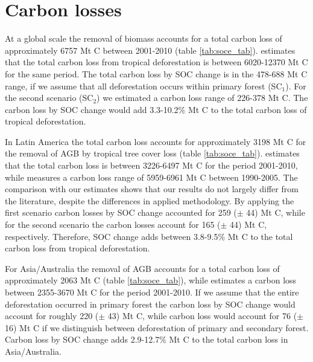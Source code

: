	\section{Carbon losses}
	\label{sec:results_carbon_loss}
		At a global scale the removal of biomass accounts for a total carbon loss of approximately 6757 Mt C between 2001-2010 (table \ref{tab:soce_tab}). \citet{Achard2014} estimates that the total carbon loss from tropical deforestation is between 6020-12370 Mt C for the same period. The total carbon loss by \ac{SOC} change is in the 478-688 Mt C range, if we assume that all deforestation occurs within primary forest (SC$_1$). For the second scenario (SC$_2$) we estimated a carbon loss range of 226-378 Mt C. The carbon loss by \ac{SOC} change would add 3.3-10.2\% Mt C to the total carbon loss of tropical deforestation.

		In Latin America the total carbon loss accounts for approximately 3198 Mt C for the removal of \ac{AGB} by tropical tree cover loss (table \ref{tab:soce_tab}). \citet{Achard2014} estimates that the total carbon loss is between 3226-6497 Mt C for the period 2001-2010, while \citet{Sy2015} measures a carbon loss range of 5959-6961 Mt C between 1990-2005. The comparison with our estimates shows that our results do not largely differ from the literature, despite the differences in applied methodology. By applying the first scenario carbon losses by \ac{SOC} change accounted for 259 ($\pm$ 44) Mt C, while for the second scenario the carbon losses account for 165 ($\pm$ 44) Mt C, respectively. Therefore, \ac{SOC} change adds between 3.8-9.5\% Mt C to the total carbon loss from tropical deforestation.

		For Asia/Australia the removal of \ac{AGB} accounts for a total carbon loss of approximately 2063 Mt C (table \ref{tab:soce_tab}), while \citet{Achard2014} estimates a carbon loss between 2355-3670 Mt C for the period 2001-2010. If we assume that the entire deforestation occurred in primary forest the carbon loss by \ac{SOC} change would account for roughly 220 ($\pm$ 43) Mt C, while carbon loss would account for 76 ($\pm$ 16) Mt C if we distinguish between deforestation of primary and secondary forest. Carbon loss by \ac{SOC} change adds 2.9-12.7\% Mt C to the total carbon loss in Asia/Australia.

